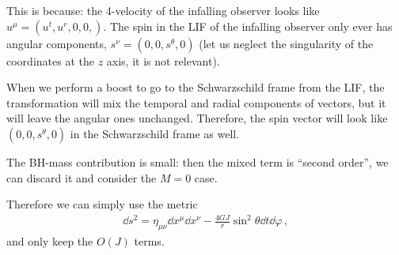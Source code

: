 \documentclass[main.tex]{subfiles}
\begin{document}
\begin{bluebox}
  This is because: the 4-velocity of the infalling observer looks like \(u^{\mu } = (u^{t}, u^{r}, 0,0,)\). The spin in the LIF of the infalling observer only ever has angular components, \(s^{\nu } = (0,0,s^{\theta }, 0)\) (let us neglect the singularity of the coordinates at the \(z\) axis, it is not relevant).
  
  When we perform a boost to go to the Schwarzschild frame from the LIF, the transformation will mix the temporal and radial components of vectors, but it will leave the angular ones unchanged. Therefore, the spin vector will look like \((0,0, s^{\theta }, 0 )\) in the Schwarzschild frame as well.
\end{bluebox}

The BH-mass contribution is small: then the mixed term is ``second order'', we can discard it and consider the \(M=0\) case. 

Therefore we can simply use the metric 
%
\begin{align}
  \dd{s^2} = \eta_{\mu \nu } \dd{x^{\mu }} \dd{x^{\nu }}
  - \frac{4GJ}{r} \sin^2 \theta \dd{t} \dd{\varphi }
\,,
\end{align}
%
and only keep the \(O(J)\) terms. 
\end{document}
